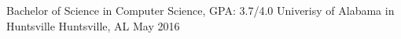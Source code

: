 
\begin{cventries}
  \cventry
    {Bachelor of Science in Computer Science, GPA: 3.7/4.0} %
    {Univerisy of Alabama in Huntsville} %
    {Huntsville, AL} %
    {May 2016} %
    {
       \begin{cvitems} %
       \end{cvitems}
    }

\end{cventries}
